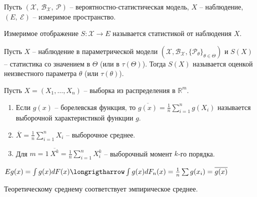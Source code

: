 Пусть $\displaystyle (\mathcal{X},\ \mathcal{B}_{\mathcal{X}},\ \mathcal{P})$ -- вероятностно-статистическая модель, $\displaystyle X$ -- наблюдение, $\displaystyle ( E,\ \mathcal{E})$ -- измеримое пространство.
\begin{definition}
Измеримое отображение $\displaystyle S:\mathcal{X}\rightarrow E$ называется статистикой от наблюдения $\displaystyle X$.
\end{definition}
\begin{definition}
Пусть $\displaystyle X$ --  наблюдение в параметрической модели $(\mathcal{X}, \mathcal{B}_{\mathcal{X}}, \{\mathcal{P}_{\theta}\}_{\theta \in \Theta})$ и $S(\displaystyle X)$ -- статистика со значением в $\Theta$ (или в $\tau (\Theta)$). Тогда $S(\displaystyle X)$ называется оценкой неизвестного параметра $\theta$ (или $\tau(\theta)$).
\end{definition}
\begin{example}
Пусть $\displaystyle X=( X_{1} ,\dotsc ,X_{n})$ -- выборка из распределения в $\displaystyle \mathbb{R}^{m}$.
\begin{enumerate}
    \item Если $\displaystyle g( x)$ -- борелевская функция, то $\displaystyle \overline{g( x)} =\frac{1}{n}\sum _{i=1}^{n} g( X_{i})$ называется выборочной характеристикой функции $\displaystyle g$.
    
    \item $\displaystyle \overline{X} =\frac{1}{n}\sum _{i=1}^{n} X_{i}$ -- выборочное среднее.
    
    \item Для $\displaystyle m=1\ \overline{X^{k}} =\frac{1}{n}\sum _{i=1}^{n} X_{i}^{k}$ -- выборочный момент $\displaystyle k$-го порядка.
\end{enumerate}
\end{example}

\begin{note}
$Eg(x) = \int g(x)dF(x) \longrigtharrow \int g(x)dF_n(x) = \frac{1}{n} \sum g(x_i) = \overline{g(x)}$

Теоретическому среднему соответствует эмпирическое среднее.
\end{note}\

